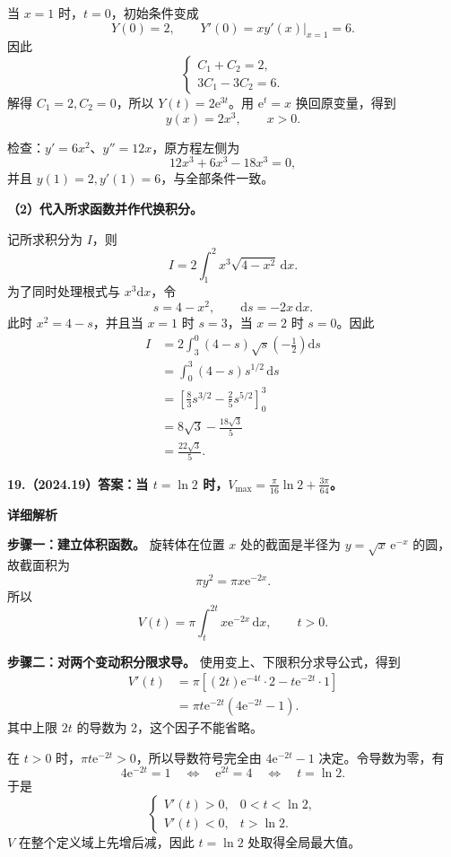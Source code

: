 \documentclass[UTF8,11pt,fontset=windows]{ctexart}
\begin{document}
当 $x=1$ 时，$t=0$，初始条件变成
$$
Y(0)=2,\qquad Y'(0)=xy'(x)\big|_{x=1}=6.
$$
因此
$$
\begin{cases}
C_1+C_2=2,\\
3C_1-3C_2=6.
\end{cases}
$$
解得 $C_1=2,C_2=0$，所以 $Y(t)=2\mathrm e^{3t}$。用 $\mathrm e^t=x$ 换回原变量，得到
$$
\boxed{y(x)=2x^3,\qquad x>0}.
$$

检查：$y'=6x^2$、$y''=12x$，原方程左侧为
$$
12x^3+6x^3-18x^3=0,
$$
并且 $y(1)=2,y'(1)=6$，与全部条件一致。

\textbf{（2）代入所求函数并作代换积分。}

记所求积分为 $I$，则
$$
I=2\int_1^2x^3\sqrt{4-x^2}\,\mathrm dx.
$$
为了同时处理根式与 $x^3\mathrm dx$，令
$$
s=4-x^2,\qquad \mathrm ds=-2x\,\mathrm dx.
$$
此时 $x^2=4-s$，并且当 $x=1$ 时 $s=3$，当 $x=2$ 时 $s=0$。因此
$$
\begin{aligned}
I
&=2\int_3^0(4-s)\sqrt s\left(-\frac12\right)\mathrm ds\\
&=\int_0^3(4-s)s^{1/2}\,\mathrm ds\\
&=\left[\frac83s^{3/2}-\frac25s^{5/2}\right]_0^3\\
&=8\sqrt3-\frac{18\sqrt3}{5}\\
&=\boxed{\frac{22\sqrt3}{5}}.
\end{aligned}
$$

\clearpage

\textbf{19.（2024.19）答案：当 $t=\ln2$ 时，$\displaystyle V_{\max}=\frac\pi{16}\ln2+\frac{3\pi}{64}$。}

\textbf{详细解析}

\textbf{步骤一：建立体积函数。} 旋转体在位置 $x$ 处的截面是半径为 $y=\sqrt{x}\,\mathrm e^{-x}$ 的圆，故截面积为
$$
\pi y^2=\pi x\mathrm e^{-2x}.
$$
所以
$$
V(t)=\pi\int_t^{2t}x\mathrm e^{-2x}\,\mathrm dx,
\qquad t>0.
$$

\textbf{步骤二：对两个变动积分限求导。} 使用变上、下限积分求导公式，得到
$$
\begin{aligned}
V'(t)
&=\pi\left[(2t)\mathrm e^{-4t}\cdot2
-t\mathrm e^{-2t}\cdot1\right]\\
&=\pi t\mathrm e^{-2t}\left(4\mathrm e^{-2t}-1\right).
\end{aligned}
$$
其中上限 $2t$ 的导数为 2，这个因子不能省略。

在 $t>0$ 时，$\pi t\mathrm e^{-2t}>0$，所以导数符号完全由 $4\mathrm e^{-2t}-1$ 决定。令导数为零，有
$$
4\mathrm e^{-2t}=1
\quad\Longleftrightarrow\quad
\mathrm e^{2t}=4
\quad\Longleftrightarrow\quad
 t=\ln2.
$$
于是
$$
\begin{cases}
V'(t)>0,&0<t<\ln2,\\
V'(t)<0,&t>\ln2.
\end{cases}
$$
$V$ 在整个定义域上先增后减，因此 $t=\ln2$ 处取得全局最大值。
\end{document}
